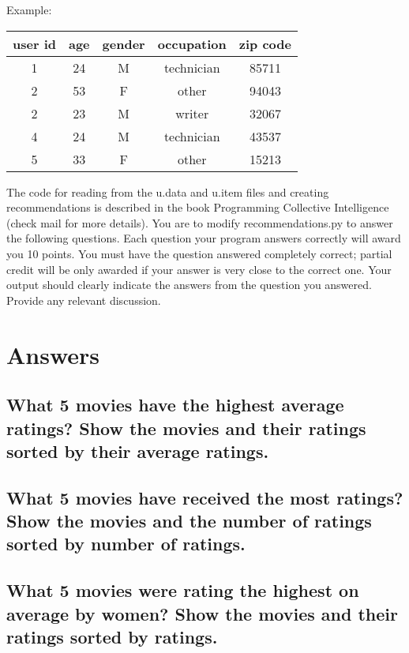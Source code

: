 \documentclass{article}
\begin{document}
Example: \\

\begin{table}[!h]
\centering
\begin{tabular}{c c c c c}
user id & age &  gender & occupation & zip code \\
\hline
1 & 24 & M & technician & 85711 \\
2 & 53 & F & other & 94043 \\
2 & 23 & M & writer & 32067 \\
4 & 24 & M & technician & 43537 \\
5 & 33 & F & other & 15213 \\
\end{tabular}
\end{table}

The code for reading from the u.data and u.item files and creating recommendations is described in the book Programming Collective Intelligence (check mail for more details). You are to modify recommendations.py to answer the following questions. Each question your program answers correctly will award you 10 points. You must have the question answered completely correct; partial credit will be only awarded if your answer is very close to the correct one. Your output should clearly indicate the answers from the question you answered. Provide any relevant discussion.

\section*{Answers}
\renewcommand\thesubsection{\arabic{subsection}}
\subsection{What 5 movies have the highest average ratings? Show the movies and their ratings sorted by their average ratings.}

\subsection{What 5 movies have received the most ratings? Show the movies and the number of ratings sorted by number of ratings.}

\subsection{What 5 movies were rating the highest on average by women? Show the movies and their ratings sorted by ratings.}
\end{document}
